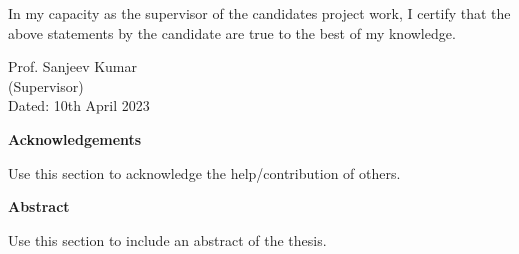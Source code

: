 \documentclass[a4paper,12pt]{report}
\numberwithin{equation}{section}
\begin{document}
In my capacity as the supervisor of the candidates project work, I certify that the above statements by the candidate are true to the best of my knowledge.

\vspace{2cm}

\begin{flushright}
Prof. Sanjeev Kumar
\\
(Supervisor)
\\
Dated: 10th April 2023
\end{flushright}

\cleardoublepage

\begin{center}
\textbf{\Large Acknowledgements}
\end{center}

Use this section to acknowledge the help/contribution of others.


\newpage
\begin{center}
    \textbf{\Large Abstract}
\end{center}

Use this section to include an abstract of the thesis.

\newpage
\restoregeometry

\listoffigures

\newpage


\tableofcontents
{} 
\newpage


\newpage
\newpage
\newpage



\newpage
\printbibliography
\end{document}
